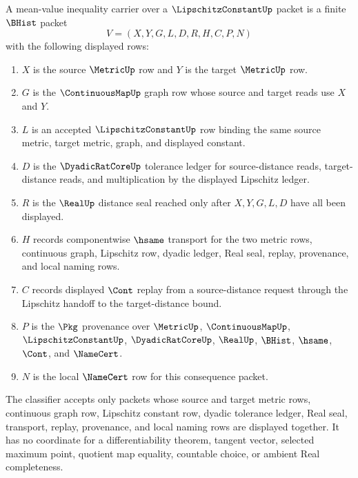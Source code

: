 \begin{definition}
\label{def:mean-value-inequality-carrier}
A mean-value inequality carrier over a $\LipschitzConstantUp$ packet is a
finite $\BHist$ packet
$$
V=(X,Y,G,L,D,R,H,C,P,N)
$$
with the following displayed rows:
\begin{enumerate}
\item $X$ is the source $\MetricUp$ row and $Y$ is the target $\MetricUp$ row.
\item $G$ is the $\ContinuousMapUp$ graph row whose source and target reads use $X$ and $Y$.
\item $L$ is an accepted $\LipschitzConstantUp$ row binding the same source metric, target metric, graph, and displayed constant.
\item $D$ is the $\DyadicRatCoreUp$ tolerance ledger for source-distance reads, target-distance reads, and multiplication by the displayed Lipschitz ledger.
\item $R$ is the $\RealUp$ distance seal reached only after $X,Y,G,L,D$ have all been displayed.
\item $H$ records componentwise $\hsame$ transport for the two metric rows, continuous graph, Lipschitz row, dyadic ledger, Real seal, replay, provenance, and local naming rows.
\item $C$ records displayed $\Cont$ replay from a source-distance request through the Lipschitz handoff to the target-distance bound.
\item $P$ is the $\Pkg$ provenance over $\MetricUp$, $\ContinuousMapUp$, $\LipschitzConstantUp$, $\DyadicRatCoreUp$, $\RealUp$, $\BHist$, $\hsame$, $\Cont$, and $\NameCert$.
\item $N$ is the local $\NameCert$ row for this consequence packet.
\end{enumerate}
The classifier accepts only packets whose source and target metric rows,
continuous graph row, Lipschitz constant row, dyadic tolerance ledger, Real
seal, transport, replay, provenance, and local naming rows are displayed
together. It has no coordinate for a differentiability theorem, tangent
vector, selected maximum point, quotient map equality, countable choice, or
ambient Real completeness.
\end{definition}

